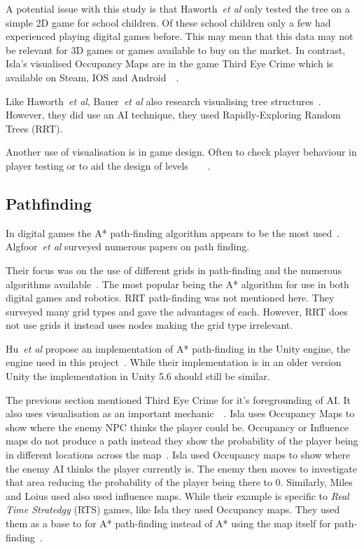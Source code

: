 \documentclass[journal]{IEEEtran}
\begin{document}
A potential issue with this study is that Haworth~\textit{et al} only tested the tree on a simple 2D game for school children. Of these school children only a few had experienced playing digital games before.  This may mean that this data may not be relevant for 3D games or games available to buy on the market.  In contrast, Isla's visualised Occupancy Maps are in the game Third Eye Crime which is available on Steam, IOS and Android~\cite{Isla2014}~\cite{game:ThirdEyeCrime}.

Like  Haworth~\textit{et al}, Bauer~\textit{et al} also research visualising tree structures~\cite{bauer2012}. However, they did use an AI technique, they used Rapidly-Exploring Random Trees (RRT).

Another use of visualisation is in game design. Often to check player behaviour in player testing or to aid the design of levels~\cite{Nelson2011}~\cite{bauer2012}~\cite{Tremblay2013}~\cite{Tremblay2014}. 


\subsection{Pathfinding}
In digital games the A* path-finding algorithm appears to be the most used~\cite{Algfoor2015}.  Algfoor~\textit{et al} surveyed numerous papers on path finding. 

Their focus was on the use of different grids in path-finding and the numerous algorithms available~\cite{Algfoor2015}. The most popular being the A* algorithm for use in both digital games and robotics. RRT path-finding was not mentioned here. 
They surveyed many grid types and gave the advantages of each. However, RRT does not use grids it instead uses nodes making the grid type irrelevant.

Hu~\textit{et al} propose an implementation of A* path-finding in the Unity engine, the engine used in this project~\cite{Hu2012}.  While their implementation is in an older version Unity the implementation in Unity 5.6 should still be similar. 

The previous section mentioned Third Eye Crime for it's foregrounding of AI.  It also uses visualisation as an important mechanic~\cite{Isla2014}~\cite{ game:ThirdEyeCrime}.  Isla uses Occupancy Maps to show where the enemy NPC thinks the player could be. Occupancy or Influence maps do not produce a path instead they show the probability of the player being in different locations across the map~\cite{Isla2014, Miles2006}. Isla used Occupancy maps to show where the enemy AI thinks the player currently is. The enemy then moves to investigate that area reducing the probability of the player being there to 0.  Similarly, Miles and Loius used also used influence maps. While their example is specific to \textit{Real Time Stratedgy} (RTS) games, like Isla they used Occupancy maps.  They used them as a base to for A* path-finding instead of A* using the map itself for path-finding~\cite{Miles2006}.\\
\end{document}
